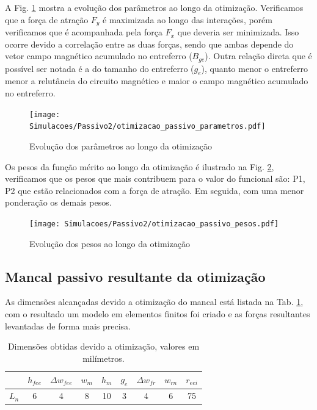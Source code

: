 A Fig. \ref{fig:otimizacao_passivo_parametros} mostra a evolução dos parâmetros ao longo da otimização. Verificamos que a força de atração $F_y$ é maximizada ao longo das interações, porém verificamos que é acompanhada pela força $F_x$ que deveria ser minimizada. Isso ocorre devido a correlação entre as duas forças, sendo que ambas depende do vetor campo magnético acumulado no entreferro ($B_{ge}$). Outra relação direta que é possível ser notada é a do tamanho do entreferro ($g_e$), quanto menor o entreferro menor a relutância do circuito magnético e maior o campo magnético acumulado no entreferro.


\begin{figure}[th!]
	\centering
	\texttt{[image: Simulacoes/Passivo2/otimizacao\_passivo\_parametros.pdf]}
	\caption{Evolução dos parâmetros ao longo da otimização}
	\label{fig:otimizacao_passivo_parametros}
\end{figure} 

Os pesos da função mérito ao longo da otimização é ilustrado na Fig. \ref{fig:otimizacao_passivo_pesos}, verificamos que os pesos que mais contribuem para o valor do funcional são: P1, P2 que estão relacionados com a força de atração. Em seguida, com uma menor ponderação os demais pesos. 

\begin{figure}[th!]
	\centering
	\texttt{[image: Simulacoes/Passivo2/otimizacao\_passivo\_pesos.pdf]}
	\caption{Evolução dos pesos ao longo da otimização}
	\label{fig:otimizacao_passivo_pesos}
\end{figure} 

\subsection{Mancal passivo resultante da otimização}

As dimensões alcançadas devido a otimização do mancal está listada na Tab. \ref{tab:passivo:dimensoes:otimizado}, com o resultado um modelo em elementos finitos foi criado e as forças resultantes levantadas de forma mais precisa.

\begin{table}[ht!]
	\centering
	\begin{tabular}{c c c c c c c c c}
		& $h_{fee}$ &$\Delta w_{fee}$ & $w_m$ & $h_m$  & $g_e$ & $\Delta w_{fr}$ & $w_{rn}$ & $r_{eei}$ \\ \hline \hline
		$L_{n}$  	&  6 &   4 &    8 &    10 &   3 &  4 &   6 &    75 \\
	\end{tabular} 
	\caption{Dimensões obtidas devido a otimização, valores em milímetros.}
	\label{tab:passivo:dimensoes:otimizado} 
\end{table} 

